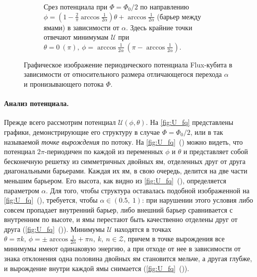 \documentclass[12pt]{article}
\numberwithin{equation}{section}
\begin{document}
\begin{figure}[!p]
\begin{subfigure}[t]{0.49\linewidth}
\caption{Срез потенциала при $\Phi = \Phi_0/2$ по направлению $\phi = \left(1 - \frac{2}{\pi}\arccos
\frac{1}{2\alpha}\right)\theta+\arccos\frac{1}{2\alpha}$ (барьер между ямами) в зависимости от $\alpha$. Здесь крайние точки отвечают минимумам $\mathcal{U}$ при $\theta=0\ (\pi),\ \phi=\arccos
\frac{1}{2\alpha}\ \left(\pi - \arccos\frac{1}{2\alpha}\right)$.}
\label{fig:U_cut2}
\end{subfigure}
\endgroup
\caption{Графическое изображение периодического потенциала Flux-кубита в зависимости от относительного размера отличающегося перехода $\alpha$ и пронизывающего потока $\Phi$.}
\label{fig:U_fq}
\end{figure} 

\paragraph{Анализ потенциала.} Прежде всего рассмотрим потенциал $\mathcal{U}(\phi, \theta)$. На \autoref{fig:U_fq} представлены графики, демонстрирующие его структуру в случае $\Phi = \Phi_0/2$, или в так называемой \textit{точке вырождения} по потоку. На \autoref{fig:U_fq}~() можно видеть, что потенциал $2\pi$-периодичен по каждой из переменных $\phi$ и $\theta$ и представляет собой бесконечную решетку из симметричных двойных ям, отделенных друг от друга диагональными барьерами. Каждая их ям, в свою очередь, делится на две части меньшим барьером. Его высота, как видно из \autoref{fig:U_fq}~(), определяется параметром $\alpha$. Для того, чтобы структура оставалась подобной изображенной на \autoref{fig:U_fq}~(), требуется, чтобы $\alpha\in(0.5,\ 1)$: при нарушении этого условия либо совсем пропадает внутренний барьер, либо внешний барьер сравнивается с внутренним по высоте, и ямы перестают быть качественно отделены друг от друга (\autoref{fig:U_fq}~()). Минимумы $\mathcal{U}$ находятся в точках $\theta=\pi k,\ \phi=\pm\arccos\frac{1}{2\alpha}+\pi n,\ k,\ n\in\mathcal{Z}$, причем в точке вырождения все минимумы имеют одинаковую энергию, а при отходе от нее в зависимости от знака отклонения одна половина двойных ям становится мельче, а другая глубже, и вырождение внутри каждой ямы снимается (\autoref{fig:U_fq}~()). 
\end{document}
